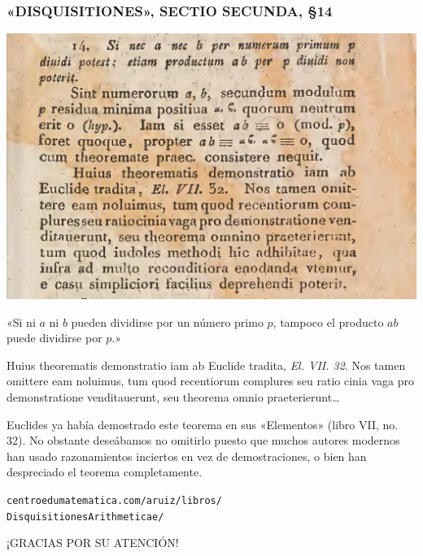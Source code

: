 \begin{frame}
  \frametitle{«DISQUISITIONES», SECTIO SECUNDA, \S 14}

  \begin{center}
    \includegraphics[width=.9\textwidth]{pic/disquisitiones-14.jpg}

    «Si ni $a$ ni $b$ pueden dividirse por un número primo $p$, tampoco el
    producto $ab$ puede dividirse por $p$.»
  \end{center}
\end{frame}

\begin{frame}

  \begin{multicols}{2}\small
    Huius theorematis demonstratio iam ab Euclide tradita,
    \emph{El. VII. 32}. Nos tamen omittere eam noluimus, tum quod recentiorum
    complures seu ratio cinia vaga pro demonstratione venditauerunt,
    seu theorema omnio praeterierunt\dots

    \vfill\null
    \columnbreak

    Euclides ya había demostrado este teorema en sus «Elementos» (libro VII,
    no. 32). No obstante deseábamos no omitirlo puesto que muchos autores
    modernos han usado razonamientos inciertos en vez de demostraciones, o bien
    han despreciado el teorema completamente.
  \end{multicols}

  \texttt{centroedumatematica.com/aruiz/libros/\\
    DisquisitionesArithmeticae/}
\end{frame}

\begin{frame}

  \vfill

  \begin{center}\huge\headingfont
    ¡GRACIAS POR SU ATENCIÓN!
  \end{center}

  \vfill
\end{frame}

